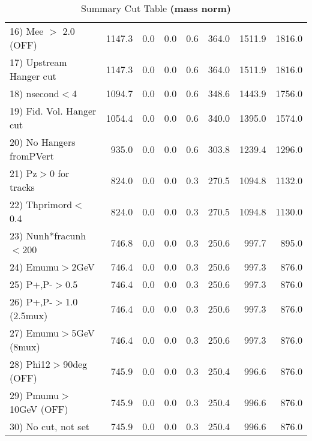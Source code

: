 \begin{table}[h!]
{{\begin{tabular}{||l||r|r|r|r|r||r||r||}
 16) Mee $>$ 2.0  (OFF)   &    1147.3 &       0.0 &       0.0 &       0.6 &     364.0 &    1511.9 &    1816.0 \\
 17) Upstream Hanger cut  &    1147.3 &       0.0 &       0.0 &       0.6 &     364.0 &    1511.9 &    1816.0 \\
 18) nsecond$<$4          &    1094.7 &       0.0 &       0.0 &       0.6 &     348.6 &    1443.9 &    1756.0 \\
 19) Fid. Vol. Hanger cut &    1054.4 &       0.0 &       0.0 &       0.6 &     340.0 &    1395.0 &    1574.0 \\
 20) No Hangers fromPVert &     935.0 &       0.0 &       0.0 &       0.6 &     303.8 &    1239.4 &    1296.0 \\
 21) Pz$>$0 for tracks    &     824.0 &       0.0 &       0.0 &       0.3 &     270.5 &    1094.8 &    1132.0 \\
 22) Thprimord$<$0.4      &     824.0 &       0.0 &       0.0 &       0.3 &     270.5 &    1094.8 &    1130.0 \\
 23) Nunh*fracunh$<$200   &     746.8 &       0.0 &       0.0 &       0.3 &     250.6 &     997.7 &     895.0 \\
 24) Emumu$>$2GeV         &     746.4 &       0.0 &       0.0 &       0.3 &     250.6 &     997.3 &     876.0 \\
 25) P+,P-$>$0.5          &     746.4 &       0.0 &       0.0 &       0.3 &     250.6 &     997.3 &     876.0 \\
 26) P+,P-$>$1.0 (2.5mux) &     746.4 &       0.0 &       0.0 &       0.3 &     250.6 &     997.3 &     876.0 \\
 27) Emumu$>$5GeV  (8mux) &     746.4 &       0.0 &       0.0 &       0.3 &     250.6 &     997.3 &     876.0 \\
 28) Phi12$>$90deg  (OFF) &     745.9 &       0.0 &       0.0 &       0.3 &     250.4 &     996.6 &     876.0 \\
 29) Pmumu$>$10GeV  (OFF) &     745.9 &       0.0 &       0.0 &       0.3 &     250.4 &     996.6 &     876.0 \\
 30) No cut, not set      &     745.9 &       0.0 &       0.0 &       0.3 &     250.4 &     996.6 &     876.0 \\
 \hline
 \hline
 \end{tabular}
 \caption{Summary Cut Table \textbf{ (mass norm) }}
 \label{tab-sumcut}
 }}
 \end{table}
 \endinput
